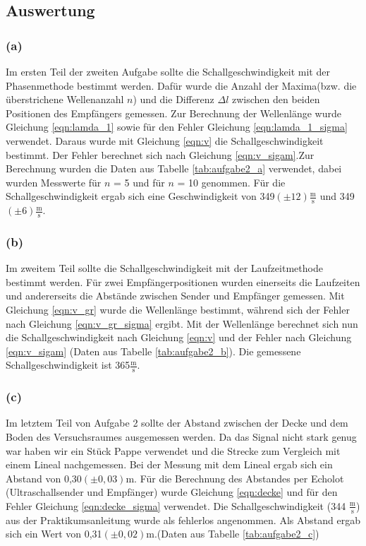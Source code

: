 \documentclass[12pt]{scrartcl}
\begin{document}
\subsection{Auswertung}
\subsubsection{(a)}
Im ersten Teil der zweiten Aufgabe sollte die Schallgeschwindigkeit mit der Phasenmethode bestimmt werden. Dafür wurde die Anzahl der Maxima(bzw. die überstrichene Wellenanzahl $n$) und die Differenz $\Delta l$ zwischen den beiden Positionen des Empfängers gemessen. Zur Berechnung der Wellenlänge wurde Gleichung \ref{eqn:lamda_1} sowie für den Fehler Gleichung \ref{eqn:lamda_1_sigma} verwendet. Daraus wurde mit Gleichung \ref{eqn:v} die Schallgeschwindigkeit bestimmt. Der Fehler berechnet sich nach Gleichung \ref{eqn:v_sigam}.Zur Berechnung wurden die Daten aus Tabelle \ref{tab:aufgabe2_a} verwendet, dabei wurden Messwerte für $n$ = 5 und für $n$ = 10 genommen. Für die Schallgeschwindigkeit ergab sich eine Geschwindigkeit von 349$(\pm 12) \frac{\text{m}}{\text{s}}$  und 349$(\pm 6) \frac{\text{m}}{\text{s}}$.

\subsubsection{(b)}
Im zweitem Teil sollte die Schallgeschwindigkeit mit der Laufzeitmethode bestimmt werden. Für zwei Empfängerpositionen wurden einerseits die Laufzeiten und andererseits die Abstände zwischen Sender und Empfänger gemessen. Mit Gleichung \ref{eqn:v_gr} wurde die Wellenlänge bestimmt, während sich der Fehler nach Gleichung \ref{eqn:v_gr_sigma} ergibt. Mit der Wellenlänge berechnet sich nun die Schallgeschwindigkeit nach Gleichung \ref{eqn:v} und der Fehler nach Gleichung \ref{eqn:v_sigam} (Daten aus Tabelle \ref{tab:aufgabe2_b}). Die gemessene Schallgeschwindigkeit ist 365$\frac{\text{m}}{\text{s}}$.

\subsubsection{(c)}
Im letztem Teil von Aufgabe 2 sollte der Abstand zwischen der Decke und dem Boden des Versuchsraumes ausgemessen werden. Da das Signal nicht stark genug war haben wir ein Stück Pappe verwendet und die Strecke zum Vergleich mit einem Lineal nachgemessen. Bei der Messung mit dem Lineal ergab sich ein Abstand von 0,30$(\pm 0,03)$m. Für die Berechnung des Abstandes per Echolot (Ultraschallsender und Empfänger) wurde Gleichung \ref{eqn:decke} und für den Fehler Gleichung \ref{eqn:decke_sigma} verwendet.
Die Schallgeschwindigkeit (344 $\frac{\text{m}}{\text{s}}$) aus der Praktikumsanleitung wurde als fehlerlos angenommen. Als Abstand ergab sich ein Wert von 0,31$(\pm 0,02)$m.(Daten aus Tabelle \ref{tab:aufgabe2_c})
\end{document}

